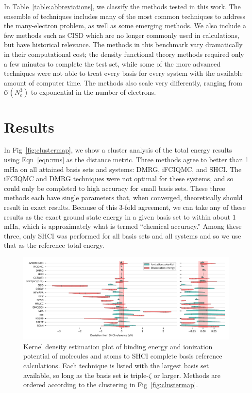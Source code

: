 In Table~\ref{table:abbreviations}, we classify the methods tested in this work. 
The ensemble of techniques includes many of the most common techniques to address the many-electron problem, as well as some emerging methods. 
We also include a few methods such as CISD which are no longer commonly used in calculations, but have historical relevance. 
The methods in this benchmark vary dramatically in their computational cost; the density functional theory methods required only a few minutes to complete the test set, while some of the more advanced techniques were not able to treat every basis for every system with the available amount of computer time.
The methods also scale very differently, ranging from $\mathcal{O}(N_e^3)$ to exponential in the number of electrons.



\section{Results} 

In Fig~\ref{fig:clustermap}, we show a cluster analysis of the total energy results using Eqn~\ref{eqn:rms} as the distance metric.
Three methods agree to better than 1 mHa on all attained basis sets and systems: DMRG, iFCIQMC, and SHCI\@. 
The iFCIQMC and DMRG techniques were not optimal for these systems, and so could only be completed to high accuracy for small basis sets.
These three methods each have single parameters that, when converged, theoretically should result in exact results. 
Because of this 3-fold agreement, we can take any of these results as the exact ground state energy in a given basis set to within about 1 mHa, which is approximately what is termed ``chemical accuracy.'' 
Among these three, only SHCI was performed for all basis sets and all systems and so we use that as the reference total energy.

\begin{figure}
\begin{center}
    \includegraphics[width=\linewidth]{figs/BE_IP_SHCI}
    \caption{Kernel density estimation plot of binding energy and ionization potential of molecules and atoms to SHCI complete basis reference calculations. 
	Each technique is listed with the largest basis set available, so long as the basis set is triple-$\zeta$ or larger.
	Methods are ordered according to the clustering in Fig~\ref{fig:clustermap}.
 }\label{fig:be_ip}
\end{center}
\end{figure}


